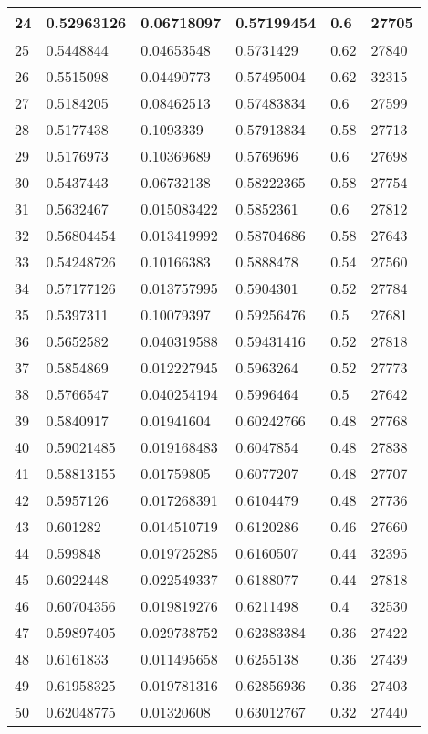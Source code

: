 \begin{longtable}{|l|l|l|l|l|l|}
24 & 0.52963126 & 0.06718097 & 0.57199454 & 0.6 & 27705 \\ \hline 
25 & 0.5448844 & 0.04653548 & 0.5731429 & 0.62 & 27840 \\ \hline 
26 & 0.5515098 & 0.04490773 & 0.57495004 & 0.62 & 32315 \\ \hline 
27 & 0.5184205 & 0.08462513 & 0.57483834 & 0.6 & 27599 \\ \hline 
28 & 0.5177438 & 0.1093339 & 0.57913834 & 0.58 & 27713 \\ \hline 
29 & 0.5176973 & 0.10369689 & 0.5769696 & 0.6 & 27698 \\ \hline 
30 & 0.5437443 & 0.06732138 & 0.58222365 & 0.58 & 27754 \\ \hline 
31 & 0.5632467 & 0.015083422 & 0.5852361 & 0.6 & 27812 \\ \hline 
32 & 0.56804454 & 0.013419992 & 0.58704686 & 0.58 & 27643 \\ \hline 
33 & 0.54248726 & 0.10166383 & 0.5888478 & 0.54 & 27560 \\ \hline 
34 & 0.57177126 & 0.013757995 & 0.5904301 & 0.52 & 27784 \\ \hline 
35 & 0.5397311 & 0.10079397 & 0.59256476 & 0.5 & 27681 \\ \hline 
36 & 0.5652582 & 0.040319588 & 0.59431416 & 0.52 & 27818 \\ \hline 
37 & 0.5854869 & 0.012227945 & 0.5963264 & 0.52 & 27773 \\ \hline 
38 & 0.5766547 & 0.040254194 & 0.5996464 & 0.5 & 27642 \\ \hline 
39 & 0.5840917 & 0.01941604 & 0.60242766 & 0.48 & 27768 \\ \hline 
40 & 0.59021485 & 0.019168483 & 0.6047854 & 0.48 & 27838 \\ \hline 
41 & 0.58813155 & 0.01759805 & 0.6077207 & 0.48 & 27707 \\ \hline 
42 & 0.5957126 & 0.017268391 & 0.6104479 & 0.48 & 27736 \\ \hline 
43 & 0.601282 & 0.014510719 & 0.6120286 & 0.46 & 27660 \\ \hline 
44 & 0.599848 & 0.019725285 & 0.6160507 & 0.44 & 32395 \\ \hline 
45 & 0.6022448 & 0.022549337 & 0.6188077 & 0.44 & 27818 \\ \hline 
46 & 0.60704356 & 0.019819276 & 0.6211498 & 0.4 & 32530 \\ \hline 
47 & 0.59897405 & 0.029738752 & 0.62383384 & 0.36 & 27422 \\ \hline 
48 & 0.6161833 & 0.011495658 & 0.6255138 & 0.36 & 27439 \\ \hline 
49 & 0.61958325 & 0.019781316 & 0.62856936 & 0.36 & 27403 \\ \hline 
50 & 0.62048775 & 0.01320608 & 0.63012767 & 0.32 & 27440 \\ \hline 
\end{longtable}